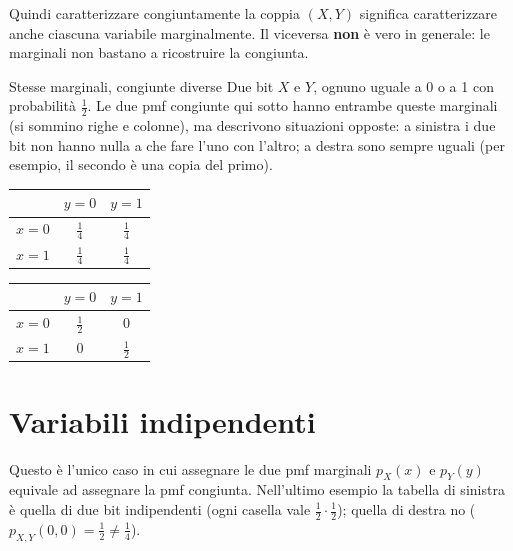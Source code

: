Quindi caratterizzare congiuntamente la coppia $(X, Y)$ significa caratterizzare anche ciascuna variabile
marginalmente. Il viceversa \textbf{non} è vero in generale: le marginali non bastano a ricostruire la congiunta.

\begin{esempio}{Stesse marginali, congiunte diverse}
Due bit $X$ e $Y$, ognuno uguale a 0 o a 1 con probabilità $\frac12$. Le due pmf congiunte qui sotto hanno entrambe
queste marginali (si sommino righe e colonne), ma descrivono situazioni opposte: a sinistra i due bit non hanno nulla a
che fare l'uno con l'altro; a destra sono sempre uguali (per esempio, il secondo è una copia del primo).
\begin{center}
\renewcommand{\arraystretch}{1.5}
\begin{tabular}{c|cc}
  & $y = 0$ & $y = 1$ \\ \hline
  $x = 0$ & $\frac14$ & $\frac14$ \\
  $x = 1$ & $\frac14$ & $\frac14$
\end{tabular}
\hspace{2cm}
\begin{tabular}{c|cc}
  & $y = 0$ & $y = 1$ \\ \hline
  $x = 0$ & $\frac12$ & $0$ \\
  $x = 1$ & $0$ & $\frac12$
\end{tabular}
\end{center}
\end{esempio}

\section{Variabili indipendenti}


Questo è l'unico caso in cui assegnare le due pmf marginali $p_X(x)$ e $p_Y(y)$ equivale ad assegnare la pmf
congiunta. Nell'ultimo esempio la tabella di sinistra è quella di due bit indipendenti (ogni casella vale
$\frac12 \cdot \frac12$); quella di destra no ($p_{X,Y}(0, 0) = \frac12 \neq \frac14$).

